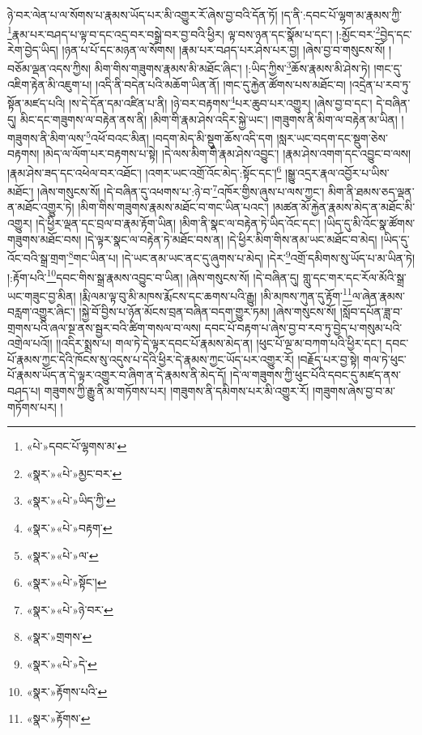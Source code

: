ཉེ་བར་ལེན་པ་ལ་སོགས་པ་རྣམས་ཡོད་པར་མི་འགྱུར་རོ་ཞེས་བྱ་བའི་དོན་ཏོ། །ད་ནི་:དབང་པོ་ལྷག་མ་རྣམས་ཀྱི་\footnote{«པེ་»དབང་པོ་ལྷགས་མ་}རྣམ་པར་བཤད་པ་ལྟ་བ་དང་འདྲ་བར་བསྒྲེ་བར་བྱ་བའི་ཕྱིར། ལྟ་བས་ཉན་དང་སྣོམ་པ་དང་། །:མྱོང་བར་\footnote{«སྣར་»«པེ་»མྱང་བར་}བྱེད་དང་རེག་བྱེད་ཡིད། །ཉན་པ་པོ་དང་མཉན་ལ་སོགས། །རྣམ་པར་བཤད་པར་ཤེས་པར་བྱ། །ཞེས་བྱ་བ་གསུངས་སོ། །བཅོམ་ལྡན་འདས་ཀྱིས། མིག་གིས་གཟུགས་རྣམས་མི་མཐོང་ཞིང་། །:ཡིད་ཀྱིས་\footnote{«སྣར་»«པེ་»ཡིད་ཀྱི་}ཆོས་རྣམས་མི་ཤེས་ཏེ། །གང་དུ་འཇིག་རྟེན་མི་འཇུག་པ། །འདི་ནི་བདེན་པའི་མཆོག་ཡིན་ནོ། །གང་དུ་རྐྱེན་ཚོགས་པས་མཐོང་བ། །འདྲེན་པ་རབ་ཏུ་སྟོན་མཛད་པའི། །ས་དེ་དོན་དམ་འཛིན་པ་ནི། །ཉེ་བར་བརྟགས་\footnote{«སྣར་»«པེ་»བརྟག་}པར་ཆུབ་པར་འགྱུར། །ཞེས་བྱ་བ་དང་། དེ་བཞིན་དུ། མིང་དང་གཟུགས་ལ་བརྟེན་ནས་ནི། །མིག་གི་རྣམ་ཤེས་འདིར་སྐྱེ་ཡང་། །གཟུགས་ནི་མིག་ལ་བརྟེན་མ་ཡིན། །གཟུགས་ནི་མིག་ལས་\footnote{«སྣར་»«པེ་»ལ་}འཕོ་བའང་མིན། །བདག་མེད་མི་སྡུག་ཆོས་འདི་དག །སླར་ཡང་བདག་དང་སྡུག་ཅེས་བརྟགས། །མེད་ལ་ལོག་པར་བརྟགས་པ་སྟེ། །དེ་ལས་མིག་གི་རྣམ་ཤེས་འབྱུང་། །རྣམ་ཤེས་འགག་དང་འབྱུང་བ་ལས། །རྣམ་ཤེས་ཟད་དང་འཕེལ་བར་འཐོང་། །འགར་ཡང་འགྲོ་འོང་མེད་:སྟོང་དང་།\footnote{«སྣར་»«པེ་»སྟོང་།} །སྒྱུ་འདྲར་རྣལ་འབྱོར་པ་ཡིས་མཐོང་། །ཞེས་གསུངས་སོ། །དེ་བཞིན་དུ་འཕགས་པ་:ཉེ་བ་\footnote{«སྣར་»«པེ་»ཉེ་བར་}འཁོར་གྱིས་ཞུས་པ་ལས་ཀྱང་། མིག་ནི་ཐམས་ཅད་ལྡན་ན་མཐོང་འགྱུར་ཏེ། །མིག་གིས་གཟུགས་རྣམས་མཐོང་བ་གང་ཡིན་པའང་། །མཚན་མོ་རྐྱེན་རྣམས་མེད་ན་མཐོང་མི་འགྱུར། །དེ་ཕྱིར་ལྡན་དང་བྲལ་བ་རྣམ་རྟོག་ཡིན། །མིག་ནི་སྣང་ལ་བརྟེན་ཏེ་ཡིད་འོང་དང་། །ཡིད་དུ་མི་འོང་སྣ་ཚོགས་གཟུགས་མཐོང་བས། །དེ་ལྟར་སྣང་ལ་བརྟེན་ཏེ་མཐོང་བས་ན། །དེ་ཕྱིར་མིག་གིས་ནམ་ཡང་མཐོང་བ་མེད། །ཡིད་དུ་འོང་བའི་སྒྲ་གྲག་\footnote{«སྣར་»གྲགས་}གང་ཡིན་པ། །དེ་ཡང་ནམ་ཡང་ནང་དུ་ཞུགས་པ་མེད། །དེར་\footnote{«སྣར་»«པེ་»དེ་}འགྲོ་དམིགས་སུ་ཡོད་པ་མ་ཡིན་ཏེ། །:རྟོག་པའི་\footnote{«སྣར་»རྟོགས་པའི་}དབང་གིས་སྒྲ་རྣམས་འབྱུང་བ་ཡིན། །ཞེས་གསུངས་སོ། །དེ་བཞིན་དུ། གླུ་དང་གར་དང་རོལ་མོའི་སྒྲ་ཡང་གཟུང་བྱ་མིན། །རྨི་ལམ་ལྟ་བུ་མི་མཁས་རྨོངས་དང་ཆགས་པའི་རྒྱུ། །མི་མཁས་ཀུན་དུ་རྟོག་\footnote{«སྣར་»རྟོགས་}ལ་ཞེན་རྣམས་བརླག་འགྱུར་ཞིང་། །སྐྱེ་བོ་བྱིས་པ་ཉོན་མོངས་བྲན་བཞིན་བདག་གྱུར་ཏམ། །ཞེས་གསུངས་སོ། །སློབ་དཔོན་ཟླ་བ་གྲགས་པའི་ཞལ་སྔ་ནས་སྦྱར་བའི་ཚིག་གསལ་བ་ལས། དབང་པོ་བརྟག་པ་ཞེས་བྱ་བ་རབ་ཏུ་བྱེད་པ་གསུམ་པའི་འགྲེལ་པའོ།། །།འདིར་སྨྲས་པ། གལ་ཏེ་དེ་ལྟར་དབང་པོ་རྣམས་མེད་ན། །ཕུང་པོ་ལྔ་མ་བཀག་པའི་ཕྱིར་དང་། དབང་པོ་རྣམས་ཀྱང་དེའི་ཁོངས་སུ་འདུས་པ་དེའི་ཕྱིར་དེ་རྣམས་ཀྱང་ཡོད་པར་འགྱུར་རོ། །བརྗོད་པར་བྱ་སྟེ། གལ་ཏེ་ཕུང་པོ་རྣམས་ཡོད་ན་དེ་ལྟར་འགྱུར་བ་ཞིག་ན་དེ་རྣམས་ནི་མེད་དོ། །དེ་ལ་གཟུགས་ཀྱི་ཕུང་པོའི་དབང་དུ་མཛད་ནས་བཤད་པ། གཟུགས་ཀྱི་རྒྱུ་ནི་མ་གཏོགས་པར། །གཟུགས་ནི་དམིགས་པར་མི་འགྱུར་རོ། །གཟུགས་ཞེས་བྱ་བ་མ་གཏོགས་པར། །
